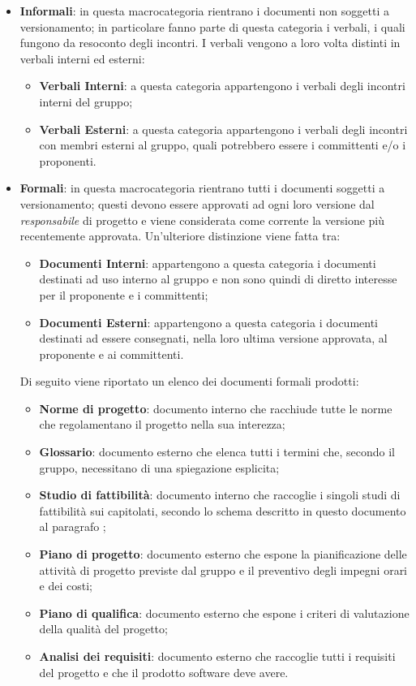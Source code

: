 \begin{itemize}
    \item \textbf{Informali}: in questa macrocategoria rientrano i documenti non soggetti a versionamento; in
    particolare fanno parte di questa categoria i verbali, i quali fungono da resoconto degli incontri. I verbali
    vengono a loro volta distinti in verbali interni ed esterni:
    \begin{itemize}
        \item \textbf{Verbali Interni}: a questa categoria appartengono i verbali degli incontri interni del gruppo;
        \item \textbf{Verbali Esterni}: a questa categoria appartengono i verbali degli incontri con membri esterni al
        gruppo, quali potrebbero essere i committenti e/o i proponenti.
    \end{itemize}

    \item \textbf{Formali}: in questa macrocategoria rientrano tutti i documenti soggetti a versionamento; questi devono
    essere approvati ad ogni loro versione dal \emph{responsabile} di progetto e viene considerata come corrente la
    versione più recentemente approvata. Un'ulteriore distinzione viene fatta tra:
    \begin{itemize}
        \item \textbf{Documenti Interni}: appartengono a questa categoria i documenti destinati ad uso interno al
        gruppo e non sono quindi di diretto interesse per il proponente e i committenti;
        \item \textbf{Documenti Esterni}: appartengono a questa categoria i documenti destinati ad essere consegnati,
        nella loro ultima versione approvata, al proponente e ai committenti.
    \end{itemize}
    Di seguito viene riportato un elenco dei documenti formali prodotti:
    \begin{itemize}
        \item \textbf{Norme di progetto}: documento interno che racchiude tutte le norme che regolamentano il progetto
        nella sua interezza;
        \item \textbf{Glossario}: documento esterno che elenca tutti i termini che, secondo il gruppo, necessitano di
        una spiegazione esplicita;
        \item \textbf{Studio di fattibilità}: documento interno che raccoglie i singoli studi di fattibilità sui
        capitolati, secondo lo schema descritto in questo documento al paragrafo ;
        \item \textbf{Piano di progetto}: documento esterno che espone la pianificazione delle attività di progetto
        previste dal gruppo e il preventivo degli impegni orari e dei costi;
        \item \textbf{Piano di qualifica}: documento esterno che espone i criteri di valutazione della qualità del
        progetto;
        \item \textbf{Analisi dei requisiti}: documento esterno che raccoglie tutti i requisiti del progetto e che il
        prodotto software deve avere.
  \end{itemize}


\end{itemize}
